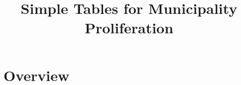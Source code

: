 \documentclass{article}
\title{Simple Tables for Municipality Proliferation}
\begin{document}
\maketitle
\tableofcontents
{\footnotesize 
\listoffigures
\listoftables}
\clearpage

\section{Overview}

\begin{table}
\footnotesize
\centering
\caption{Pretrends}
\begin{threeparttable}
\footnotesize

\end{threeparttable}
\label{tab:mig_new}
\end{table}
\clearpage


\begin{table}
\footnotesize
\centering
\caption{Pretrends update}
\begin{threeparttable}
\footnotesize

\end{threeparttable}
\label{tab:mig_new}
\end{table}
\clearpage


\begin{table}
\footnotesize
\centering
\caption{Pretrends update}
\begin{threeparttable}
\footnotesize

\end{threeparttable}
\label{tab:mig_new}
\end{table}
\clearpage
\begin{table}
\footnotesize
\centering
\caption{30 40 link sample}
\begin{threeparttable}
\footnotesize

\end{threeparttable}
\label{tab:mig_new}
\end{table}
\clearpage
\end{document}
